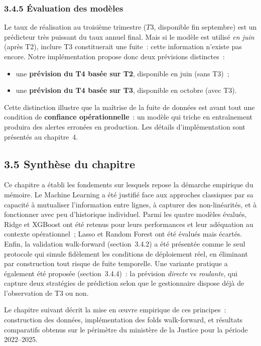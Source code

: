 \subsubsection*{3.4.5 \quad Évaluation des modèles}

Le taux de réalisation au troisième trimestre ($T3$, disponible fin septembre) est
un prédicteur très puissant du taux annuel final. Mais si le modèle est utilisé
\textit{en juin} (après T2), inclure T3 constituerait une fuite~: cette information
n'existe pas encore. Notre implémentation propose donc deux prévisions distinctes~:
\begin{itemize}
    \item une \textbf{prévision du T4 basée sur T2}, disponible en juin (sans T3)~;
    \item une \textbf{prévision du T4 basée sur T3}, disponible en octobre (avec T3).
\end{itemize}

Cette distinction illustre que la maîtrise de la fuite de données est avant tout une
condition de \textbf{confiance opérationnelle}~: un modèle qui triche en entraînement
produira des alertes erronées en production. Les détails d'implémentation sont
présentés au chapitre~4.

\subsection*{3.5 \quad Synthèse du chapitre}

Ce chapitre a établi les fondements sur lesquels repose la démarche empirique
du mémoire. Le Machine Learning a été justifié face aux approches classiques par sa
capacité à mutualiser l'information entre lignes, à capturer des non-linéarités, et
à fonctionner avec peu d'historique individuel. Parmi les quatre modèles évalués,
Ridge et XGBoost ont été retenus pour leurs performances et leur adéquation au
contexte opérationnel~; Lasso et Random Forest ont été évalués mais écartés. Enfin,
la validation walk-forward (section~3.4.2) a été présentée comme le seul protocole
qui simule fidèlement les conditions de déploiement réel, en éliminant par
construction tout risque de fuite temporelle. Une variante pratique a également été
proposée (section~3.4.4)~: la prévision \textit{directe} vs \textit{roulante}, qui
capture deux stratégies de prédiction selon que le gestionnaire dispose déjà de
l'observation de T3 ou non.

Le chapitre suivant décrit la mise en œuvre empirique de ces principes~: construction
des données, implémentation des folds walk-forward, et résultats comparatifs obtenus
sur le périmètre du ministère de la Justice pour la période 2022--2025.
